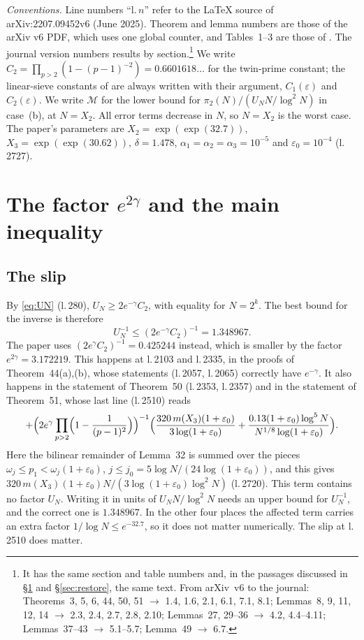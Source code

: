 \documentclass[11pt,a4paper]{amsart}
\theoremstyle{remark}
\newcommand{\eps}{\varepsilon}
\newcommand{\BJS}{\cite{BJS}}
\begin{document}
\emph{Conventions.} Line numbers ``l.\,$n$'' refer to the \LaTeX{} source of arXiv:2207.09452v6 (June 2025).
Theorem and lemma numbers are those of the arXiv v6 PDF, which uses one global counter, and Tables~1--3 are
those of \BJS. The journal version numbers results by section.\footnote{It has the same section and table numbers and, in the passages discussed in
\S\ref{sec:egamma} and \S\ref{sec:restore}, the same text. From arXiv~v6 to the journal:
Theorems~3, 5, 6, 44, 50, 51 $\to$ 1.4, 1.6, 2.1, 6.1, 7.1, 8.1;
Lemmas~8, 9, 11, 12, 14 $\to$ 2.3, 2.4, 2.7, 2.8, 2.10; Lemmas~27, 29--36 $\to$ 4.2, 4.4--4.11;
Lemmas~37--43 $\to$ 5.1--5.7; Lemma~49 $\to$ 6.7.} We write
$C_2=\prod_{p>2}(1-(p-1)^{-2})=0.6601618\ldots$ for the twin-prime constant; the linear-sieve constants of
\BJS{} are always written with their argument, $C_1(\eps)$ and $C_2(\eps)$. We write $\mathcal M$ for the lower
bound for $\pi_2(N)/(U_NN/\log^2N)$ in case~(b), at $N=X_2$. All error terms decrease in $N$, so $N=X_2$ is the worst
case. The paper's parameters are $X_2=\exp(\exp(32.7))$, $X_3=\exp(\exp(30.62))$, $\delta=1.478$,
$\alpha_1=\alpha_2=\alpha_3=10^{-5}$ and $\eps_0=10^{-4}$ (l.\,2727).

\section{The factor \texorpdfstring{$e^{2\gamma}$}{e\^{}(2gamma)} and the main inequality}\label{sec:egamma}

\subsection{The slip}\label{sec:slip}
By \eqref{eq:UN} (l.\,280), $U_N\ge 2e^{-\gamma}C_2$, with equality for $N=2^k$. The best bound for the inverse is
therefore
\[
U_N^{-1}\le(2e^{-\gamma}C_2)^{-1}=1.348967 .
\]
The paper uses $(2e^{\gamma}C_2)^{-1}=0.425244$ instead, which is smaller by the factor
$e^{2\gamma}=3.172219$. This happens at l.\,2103 and l.\,2335, in the proofs of Theorem~44(a),(b), whose
statements (l.\,2057, l.\,2065) correctly have $e^{-\gamma}$. It also happens in the statement of Theorem~50
(l.\,2353, l.\,2357) and in the statement of Theorem~51, whose last line (l.\,2510) reads
\[
+\Bigl(2e^{\gamma}\prod_{p>2}\Bigl(1-\frac1{(p-1)^2}\Bigr)\Bigr)^{-1}
\Bigl(\frac{320\,m(X_3)(1+\eps_0)}{3\log(1+\eps_0)}+\frac{0.13(1+\eps_0)\log^5N}{N^{1/8}\log(1+\eps_0)}\Bigr).
\]
Here the bilinear remainder of Lemma~32 is summed over the pieces $\omega_j\le p_1<\omega_j(1+\eps_0)$,
$j\le j_0=5\log N/(24\log(1+\eps_0))$, and this gives $320\,m(X_3)(1+\eps_0)N/(3\log(1+\eps_0)\log^2N)$ (l.\,2720). This term contains no factor $U_N$. Writing
it in units of $U_NN/\log^2N$ needs an upper bound for $U_N^{-1}$, and the correct one is $1.348967$. In the other
four places the affected term carries an extra factor $1/\log N\le e^{-32.7}$, so it does not matter numerically.
The slip at l.\,2510 does matter.
\end{document}
